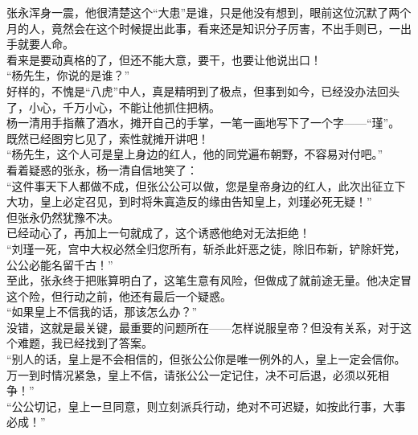 \begin{multicols}{\theparacolNo}
张永浑身一震，他很清楚这个“大患”是谁，只是他没有想到，眼前这位沉默了两个月的人，竟然会在这个时候提出此事，看来还是知识分子厉害，不出手则已，一出手就要人命。\\

看来是要动真格的了，但还不能大意，要干，也要让他说出口！\\

“杨先生，你说的是谁？”\\

好样的，不愧是“八虎”中人，真是精明到了极点，但事到如今，已经没办法回头了，小心，千万小心，不能让他抓住把柄。\\

杨一清用手指蘸了酒水，摊开自己的手掌，一笔一画地写下了一个字——“瑾”。\\

既然已经图穷匕见了，索性就摊开讲吧！\\

“杨先生，这个人可是皇上身边的红人，他的同党遍布朝野，不容易对付吧。”\\

看着疑惑的张永，杨一清自信地笑了：\\

“这件事天下人都做不成，但张公公可以做，您是皇帝身边的红人，此次出征立下大功，皇上必定召见，到时将朱寘造反的缘由告知皇上，刘瑾必死无疑！”\\

但张永仍然犹豫不决。\\

已经动心了，再加上一句就成了，这个诱惑他绝对无法拒绝！\\

“刘瑾一死，宫中大权必然全归您所有，斩杀此奸恶之徒，除旧布新，铲除奸党，公公必能名留千古！”\\

至此，张永终于把账算明白了，这笔生意有风险，但做成了就前途无量。他决定冒这个险，但行动之前，他还有最后一个疑惑。\\

“如果皇上不信我的话，那该怎么办？”\\

没错，这就是最关键，最重要的问题所在——怎样说服皇帝？但没有关系，对于这个难题，我已经找到了答案。\\

“别人的话，皇上是不会相信的，但张公公你是唯一例外的人，皇上一定会信你。万一到时情况紧急，皇上不信，请张公公一定记住，决不可后退，必须以死相争！”\\

“公公切记，皇上一旦同意，则立刻派兵行动，绝对不可迟疑，如按此行事，大事必成！”\\


\end{multicols}
